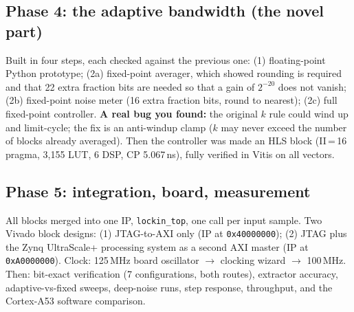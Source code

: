 \documentclass[10pt,a4paper]{article}
\renewcommand{\c}[1]{\texttt{#1}}
\begin{document}
\subsection*{Phase 4: the adaptive bandwidth (the novel part)}
Built in four steps, each checked against the previous one: (1) floating-point Python prototype; (2a) fixed-point averager, which showed rounding is required and that 22 extra fraction bits are needed so that a gain of $2^{-20}$ does not vanish; (2b) fixed-point noise meter (16 extra fraction bits, round to nearest); (2c) full fixed-point controller. \textbf{A real bug you found:} the original $k$ rule could wind up and limit-cycle; the fix is an anti-windup clamp ($k$ may never exceed the number of blocks already averaged). Then the controller was made an HLS block (II\,=\,16 pragma, 3,155 LUT, 6 DSP, CP 5.067\,ns), fully verified in Vitis on all vectors.

\subsection*{Phase 5: integration, board, measurement}
All blocks merged into one IP, \c{lockin\_top}, one call per input sample. Two Vivado block designs: (1) JTAG-to-AXI only (IP at \c{0x40000000}); (2) JTAG plus the Zynq UltraScale+ processing system as a second AXI master (IP at \c{0xA0000000}). Clock: 125\,MHz board oscillator $\to$ clocking wizard $\to$ 100\,MHz. Then: bit-exact verification (7 configurations, both routes), extractor accuracy, adaptive-vs-fixed sweeps, deep-noise runs, step response, throughput, and the Cortex-A53 software comparison.
\end{document}
